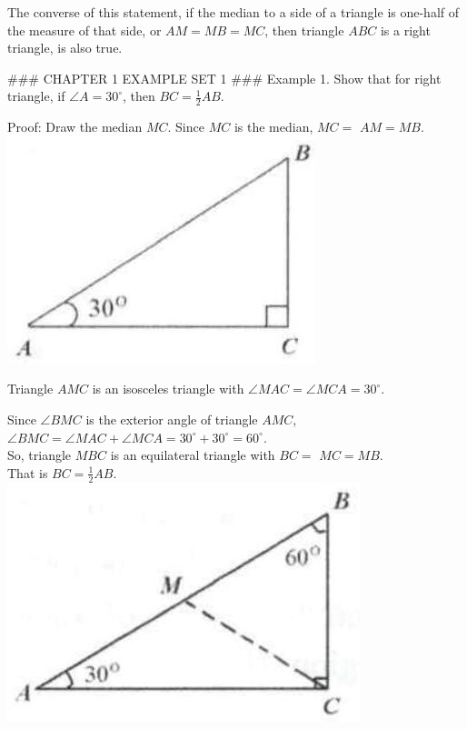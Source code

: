 \documentclass[10pt]{article}
\begin{document}
The converse of this statement, if the median to a side of a triangle is one-half of the measure of that side, or \(A M=M B=M C\), then triangle \(A B C\) is a right triangle, is also true.

### CHAPTER 1 EXAMPLE SET 1 ###
Example 1. Show that for right triangle, if \(\angle A=30^{\circ}\), then \(B C=\frac{1}{2} A B\).

Proof:
Draw the median \(M C\). Since \(M C\) is the median, \(M C=\) \(A M=M B\).\\
\includegraphics[max width=\textwidth, center]{2025_04_17_97bc1f7e44d93c271a88g-009(4)}

Triangle \(A M C\) is an isosceles triangle with \(\angle M A C=\angle M C A=30^{\circ}\).

Since \(\angle B M C\) is the exterior angle of triangle \(A M C\), \(\angle B M C=\angle M A C+\angle M C A=30^{\circ}+30^{\circ}=60^{\circ}\).\\
So, triangle \(M B C\) is an equilateral triangle with \(B C=\) \(M C=M B\).\\
That is \(B C=\frac{1}{2} A B\).\\
\includegraphics[max width=\textwidth, center]{2025_04_17_97bc1f7e44d93c271a88g-009(3)}
\end{document}
